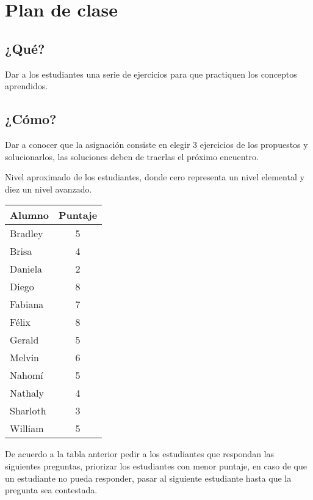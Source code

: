 \newpage
\section{Plan de clase}

\subsection{¿Qué?}

Dar a los estudiantes una serie de ejercicios para que practiquen los conceptos aprendidos.



\subsection{¿Cómo?}

\begin{activity}[][5 min]
    Dar a conocer que la asignación consiste en elegir 3 ejercicios de los propuestos y solucionarlos,
    las soluciones deben de traerlas el próximo encuentro.
\end{activity}

\par\vspace{2mm}
Nivel aproximado de los estudiantes, donde cero representa un nivel elemental y diez un nivel avanzado.
\begin{center}
    \begin{tabular}{|l|c|}
        \hline
        Alumno & Puntaje\\\hline\hline
        Bradley & 5\\\hline
        Brisa & 4\\\hline
        Daniela & 2 \\\hline
        Diego & 8 \\\hline
        Fabiana & 7 \\\hline
        Félix & 8 \\\hline
        Gerald & 5\\\hline
        Melvin & 6\\\hline
        Nahomí & 5 \\\hline
        Nathaly & 4 \\\hline
        Sharloth & 3 \\\hline
        William & 5 \\\hline
    \end{tabular}
\end{center}

De acuerdo a la tabla anterior pedir a los estudiantes que respondan las siguientes preguntas, priorizar los estudiantes
con menor puntaje, en caso de que un estudiante no pueda responder, pasar al siguiente estudiante hasta que la pregunta sea contestada.

